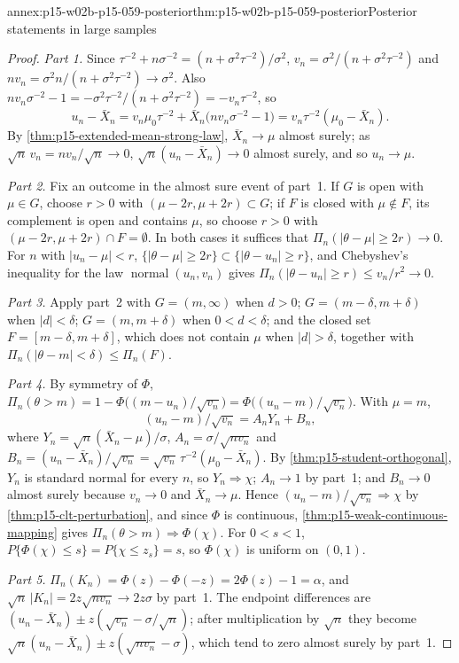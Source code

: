 \begin{annexitem}{annex:p15-w02b-p15-059-posterior}{thm:p15-w02b-p15-059-posterior}{Posterior statements in large samples}
\begin{proof}
\emph{Part 1.} Since \(\tau^{-2}+n\sigma^{-2}=(n+\sigma^2\tau^{-2})/\sigma^2\),
\(v_n=\sigma^2/(n+\sigma^2\tau^{-2})\) and
\(nv_n=\sigma^2n/(n+\sigma^2\tau^{-2})\to\sigma^2\). Also
\(nv_n\sigma^{-2}-1=-\sigma^2\tau^{-2}/(n+\sigma^2\tau^{-2})
=-v_n\tau^{-2}\), so
\[
 u_n-\bar X_n=v_n\mu_0\tau^{-2}+\bar X_n\bigl(nv_n\sigma^{-2}-1\bigr)
 =v_n\tau^{-2}(\mu_0-\bar X_n).
\]
By \cref{thm:p15-extended-mean-strong-law}, \(\bar X_n\to\mu\) almost
surely; as \(\sqrt n\,v_n=nv_n/\sqrt n\to0\),
\(\sqrt n(u_n-\bar X_n)\to0\) almost surely, and so \(u_n\to\mu\).

\emph{Part 2.} Fix an outcome in the almost sure event of part~1. If \(G\)
is open with \(\mu\in G\), choose \(r>0\) with \((\mu-2r,\mu+2r)\subset
G\); if \(F\) is closed with \(\mu\notin F\), its complement is open and
contains \(\mu\), so choose \(r>0\) with \((\mu-2r,\mu+2r)\cap
F=\emptyset\). In both cases it suffices that
\(\Pi_n(|\theta-\mu|\geq2r)\to0\). For \(n\) with \(|u_n-\mu|<r\),
\(\{|\theta-\mu|\geq2r\}\subset\{|\theta-u_n|\geq r\}\), and Chebyshev's
inequality for the law \(\operatorname{normal}(u_n,v_n)\) gives
\(\Pi_n(|\theta-u_n|\geq r)\leq v_n/r^2\to0\).

\emph{Part 3.} Apply part~2 with \(G=(m,\infty)\) when \(d>0\);
\(G=(m-\delta,m+\delta)\) when \(|d|<\delta\);
\(G=(m,m+\delta)\) when \(0<d<\delta\); and the closed set
\(F=[m-\delta,m+\delta]\), which does not contain \(\mu\) when
\(|d|>\delta\), together with \(\Pi_n(|\theta-m|<\delta)\leq\Pi_n(F)\).

\emph{Part 4.} By symmetry of \(\Phi\),
\(\Pi_n(\theta>m)=1-\Phi\bigl((m-u_n)/\sqrt{v_n}\bigr)
=\Phi\bigl((u_n-m)/\sqrt{v_n}\bigr)\). With \(\mu=m\),
\[
 (u_n-m)/\sqrt{v_n}=A_nY_n+B_n,
\]
where \(Y_n=\sqrt n(\bar X_n-\mu)/\sigma\), \(A_n=\sigma/\sqrt{nv_n}\) and
\(B_n=(u_n-\bar X_n)/\sqrt{v_n}=\sqrt{v_n}\,\tau^{-2}(\mu_0-\bar X_n)\).
By \cref{thm:p15-student-orthogonal}, \(Y_n\) is standard normal for every
\(n\), so \(Y_n\Rightarrow\chi\); \(A_n\to1\) by part~1; and \(B_n\to0\)
almost surely because \(v_n\to0\) and \(\bar X_n\to\mu\). Hence
\((u_n-m)/\sqrt{v_n}\Rightarrow\chi\) by
\cref{thm:p15-clt-perturbation}, and since \(\Phi\) is continuous,
\cref{thm:p15-weak-continuous-mapping} gives
\(\Pi_n(\theta>m)\Rightarrow\Phi(\chi)\). For \(0<s<1\),
\(P\{\Phi(\chi)\leq s\}=P\{\chi\leq z_s\}=s\), so \(\Phi(\chi)\) is
uniform on \((0,1)\).

\emph{Part 5.} \(\Pi_n(K_n)=\Phi(z)-\Phi(-z)=2\Phi(z)-1=\alpha\), and
\(\sqrt n\,|K_n|=2z\sqrt{nv_n}\to2z\sigma\) by part~1. The endpoint
differences are \((u_n-\bar X_n)\pm z(\sqrt{v_n}-\sigma/\sqrt n)\); after
multiplication by \(\sqrt n\) they become
\(\sqrt n(u_n-\bar X_n)\pm z(\sqrt{nv_n}-\sigma)\), which tend to zero
almost surely by part~1.
\end{proof}
\end{annexitem}
